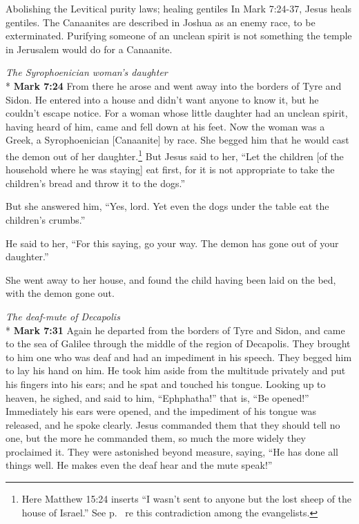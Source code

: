 \documentclass[10pt,twoside]{article} %
\newcommand{\quotesize}{\normalsize{}}
\newcommand{\comm}[1]{\begingroup \color{black!50} #1\endgroup}
\newenvironment{quotetext}{\begingroup\quotesize}{\endgroup}
\newcommand{\intex}[1]{\index[texts]{#1}}
\newcommand{\bible}[2]{\begin{quotetext}\textbf{#1}\intex{#1} #2\end{quotetext}}
\newcommand{\gospelmark}[2]{\bible{Mark #1}{#2}}
\newcommand{\subhead}[1]{\emph{#1}\\*}
\begin{document}
\begin{section}{Abolishing the Levitical purity laws; healing gentiles}
\comm{
In Mark 7:24-37, Jesus heals gentiles. The Canaanites are described in Joshua as an enemy race, to be exterminated. Purifying someone
of an unclean spirit is not something the temple in Jerusalem would do for a Canaanite.
}

\subhead{The Syrophoenician woman's daughter}\label{canaanite-woman}
\gospelmark{7:24}{
  From there he arose and went away into the borders of Tyre and Sidon. He entered into a house and didn't want anyone to know it, but he couldn't escape notice.   For a woman whose little daughter had an unclean spirit, having heard of him, came and fell down at his feet.   Now the woman was a Greek, a Syrophoenician [Canaanite] by race. She begged him that he would cast the demon out of her daughter.\footnote{Here Matthew 15:24 inserts ``I wasn't sent to anyone but the lost sheep of the house of Israel.'' See p.~\pageref{gentile-evangelists-disagree} re this contradiction among the evangelists.}   But Jesus said to her, ``Let the children
[of the household where he was staying] eat first, for it is not appropriate to take the children's bread and throw it to the dogs.''


  But she answered him, ``Yes, lord. Yet even the dogs under the table eat the children's crumbs.''

  He said to her, ``For this saying, go your way. The demon has gone out of your daughter.''

  She went away to her house, and found the child having been laid on the bed, with the demon gone out.
}

\subhead{The deaf-mute of Decapolis}
\gospelmark{7:31}{
  Again he departed from the borders of Tyre and Sidon, and came to the sea of Galilee through the middle of the region of Decapolis.   They brought to him one who was deaf and had an impediment in his speech. They begged him to lay his hand on him.   He took him aside from the multitude privately and put his fingers into his ears; and he spat and touched his tongue.   Looking up to heaven, he sighed, and said to him, ``Ephphatha!'' that is, ``Be opened!''   Immediately his ears were opened, and the impediment of his tongue was released, and he spoke clearly.   Jesus commanded them that they should tell no one, but the more he commanded them, so much the more widely they proclaimed it.   They were astonished beyond measure, saying, ``He has done all things well. He makes even the deaf hear and the mute speak!''
}




\end{section}
\end{document}
